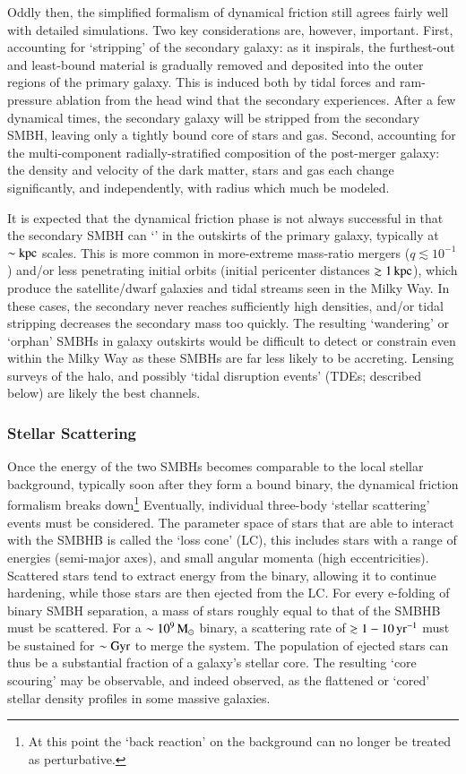 \documentclass[onecolumn,authoryear]{els-mrw}
\begin{document}
Oddly then, the simplified formalism of dynamical friction still agrees fairly well with detailed simulations.  Two key considerations are, however, important.  First, accounting for `stripping' of the secondary galaxy: as it inspirals, the furthest-out and least-bound material is gradually removed and deposited into the outer regions of the primary galaxy.  This is induced both by tidal forces and ram-pressure ablation from the head wind that the secondary experiences.  After a few dynamical times, the secondary galaxy will be stripped from the secondary SMBH, leaving only a tightly bound core of stars and gas.  Second, accounting for the multi-component radially-stratified composition of the post-merger galaxy: the density and velocity of the dark matter, stars and gas each change significantly, and independently, with radius which much be modeled.

It is expected that the dynamical friction phase is not always successful in that the secondary SMBH can `' in the outskirts of the primary galaxy, typically at $\sim \mathrm{kpc}$ scales.  This is more common in more-extreme mass-ratio mergers ($q \lesssim 10^{-1}$) and/or less penetrating initial orbits (initial pericenter distances $\gtrsim 1 \, \mathrm{kpc}$), which produce the satellite/dwarf galaxies and tidal streams seen in the Milky Way.  In these cases, the secondary never reaches sufficiently high densities, and/or tidal stripping decreases the secondary mass too quickly.  The resulting `wandering' or `orphan' SMBHs in galaxy outskirts would be difficult to detect or constrain even within the Milky Way as these SMBHs are far less likely to be accreting.  Lensing surveys of the halo, and possibly `tidal disruption events' (TDEs; described below) are likely the best channels.

\subsubsection{Stellar Scattering}\label{sec:binary_evolution_scattering}

Once the energy of the two SMBHs becomes comparable to the local stellar background, typically soon after they form a bound binary, the dynamical friction formalism breaks down\footnote{At this point the `back reaction' on the background can no longer be treated as perturbative.}  Eventually, individual three-body `stellar scattering' events must be considered.  The parameter space of stars that are able to interact with the SMBHB is called the `loss cone' (LC), this includes stars with a range of energies (semi-major axes), and small angular momenta (high eccentricities).  Scattered stars tend to extract energy from the binary, allowing it to continue hardening, while those stars are then ejected from the LC.  For every e-folding of binary SMBH separation, a mass of stars roughly equal to that of the SMBHB must be scattered.  For a $\sim 10^9 \, \textrm{M}_{\odot}$ binary, a scattering rate of $\gtrsim 1 - 10 \, \mathrm{yr}^{-1}$ must be sustained for $\sim \textrm{Gyr}$ to merge the system.  The population of ejected stars can thus be a substantial fraction of a galaxy's stellar core.  The resulting `core scouring' may be observable, and indeed observed, as the flattened or `cored' stellar density profiles in some massive galaxies.
\end{document}
